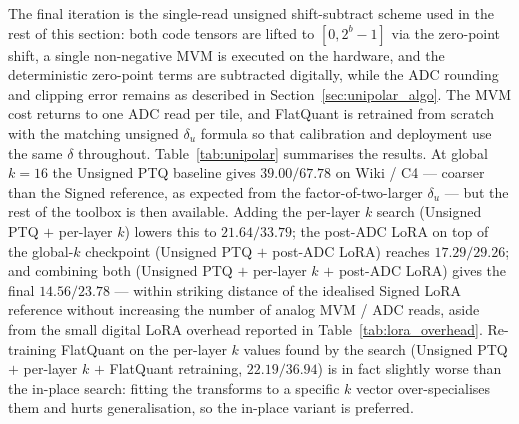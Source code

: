 \documentclass[a4paper,11pt,oneside]{article}
\theoremstyle{breakstyle}
\begin{document}
  The final iteration is the single-read unsigned shift-subtract
  scheme used in the rest of this section: both code tensors are
  lifted to $[0, 2^{b} - 1]$ via the zero-point shift, a single
  non-negative MVM is executed on the hardware, and the
  deterministic zero-point terms are subtracted digitally, while the
  ADC rounding and clipping error remains as described in
  Section~\ref{sec:unipolar_algo}.  The MVM cost returns to one
  ADC read per tile, and FlatQuant is retrained from scratch with
  the matching unsigned $\delta_u$ formula so that calibration and
  deployment use the same $\delta$ throughout.
  Table~\ref{tab:unipolar} summarises the results.  At global
  $k = 16$ the Unsigned PTQ baseline gives $39.00 / 67.78$ on
  Wiki / C4 --- coarser than the Signed reference, as expected from
  the factor-of-two-larger $\delta_u$ --- but the rest of the
  toolbox is then available.  Adding the per-layer $k$ search
  (Unsigned PTQ $+$ per-layer $k$) lowers this to $21.64 / 33.79$;
  the post-ADC LoRA on top of the global-$k$ checkpoint
  (Unsigned PTQ $+$ post-ADC LoRA) reaches $17.29 / 29.26$; and
  combining both (Unsigned PTQ $+$ per-layer $k$ $+$ post-ADC LoRA)
  gives the final $\mathbf{14.56} / \mathbf{23.78}$ --- within
  striking distance of the idealised Signed LoRA reference without
  increasing the number of analog MVM / ADC reads, aside from the
  small digital LoRA overhead reported in
  Table~\ref{tab:lora_overhead}.  Re-training FlatQuant on the
  per-layer $k$ values found by the search (Unsigned PTQ $+$
  per-layer $k$ $+$ FlatQuant retraining, $22.19 / 36.94$) is in
  fact slightly worse than the in-place search: fitting the
  transforms to a specific $k$ vector over-specialises them and
  hurts generalisation, so the in-place variant is preferred.
\end{document}
